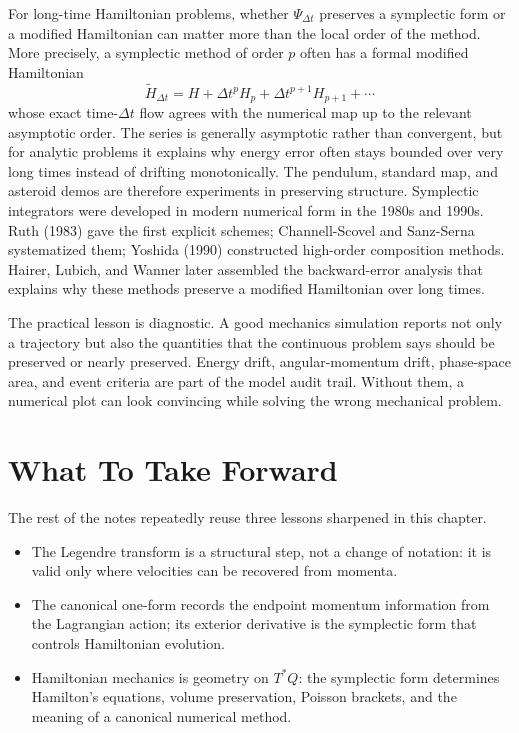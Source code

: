 For long-time Hamiltonian problems, whether \(\Psi_{\Delta t}\) preserves a
symplectic form or a modified Hamiltonian can matter more than the local order
of the method. More precisely, a symplectic method of order \(p\) often has a
formal modified Hamiltonian
\[
  \widetilde H_{\Delta t}
  =
  H+\Delta t^p H_p+\Delta t^{p+1}H_{p+1}+\cdots
\]
whose exact time-\(\Delta t\) flow agrees with the numerical map up to the
relevant asymptotic order. The series is generally asymptotic rather than
convergent, but for analytic problems it explains why energy error often stays
bounded over very long times instead of drifting monotonically. The pendulum,
standard map, and asteroid demos are therefore experiments in preserving
structure.
Symplectic integrators were developed in modern numerical form in the 1980s
and 1990s. Ruth (1983) gave the first explicit schemes; Channell-Scovel and
Sanz-Serna systematized them; Yoshida (1990) constructed high-order composition
methods. Hairer, Lubich, and Wanner later assembled the backward-error analysis
that explains why these methods preserve a modified Hamiltonian over long
times.

The practical lesson is diagnostic. A good mechanics simulation reports not
only a trajectory but also the quantities that the continuous problem says
should be preserved or nearly preserved. Energy drift, angular-momentum drift,
phase-space area, and event criteria are part of the model audit trail. Without
them, a numerical plot can look convincing while solving the wrong mechanical
problem.

\section{What To Take Forward}
\label{sec:hamiltonian-take-forward}

The rest of the notes repeatedly reuse three lessons sharpened in this
chapter.
\begin{itemize}
\item The Legendre transform is a structural step, not a change of notation:
it is valid only where velocities can be recovered from momenta.
\item The canonical one-form records the endpoint momentum information from
the Lagrangian action; its exterior derivative is the symplectic form that
controls Hamiltonian evolution.
\item Hamiltonian mechanics is geometry on \(T^*Q\): the symplectic form
determines Hamilton's equations, volume preservation, Poisson brackets, and the
meaning of a canonical numerical method.
\end{itemize}

